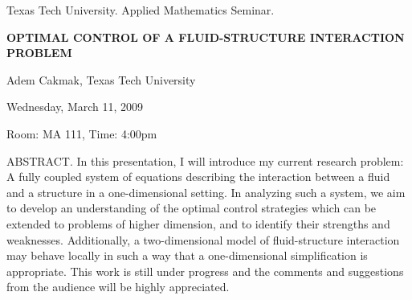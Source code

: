 \documentclass[oneside]{amsart}
\begin{document}
\begin{center}
Texas Tech University.  Applied Mathematics Seminar.

\end{center}

\begin{center}

{\LARGE \uppercase{\textbf{Optimal Control of A Fluid-structure Interaction Problem
}}}

Adem Cakmak, Texas Tech University

Wednesday, March 11, 2009

Room: MA 111, Time: 4:00pm

\end{center}

ABSTRACT.
In this presentation, I will introduce my current research problem: A fully coupled system of equations describing the interaction between a fluid and a structure in a one-dimensional setting. In analyzing such a system, we aim to develop an understanding of the optimal control strategies which can be extended to problems of higher dimension, and to identify their strengths and weaknesses. Additionally, a two-dimensional model of fluid-structure interaction may behave locally  in such a way that a one-dimensional simplification is appropriate. This work is still under progress and the comments and suggestions from the audience will be highly appreciated.
\end{document}
